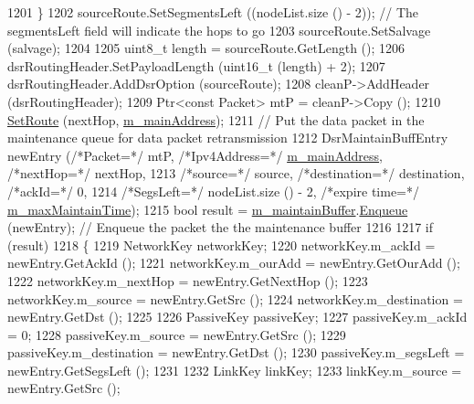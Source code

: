 \begin{DoxyCode}
1201         \}
1202       sourceRoute.SetSegmentsLeft ((nodeList.size () - 2));     \textcolor{comment}{// The segmentsLeft field will indicate the
       hops to go}
1203       sourceRoute.SetSalvage (salvage);
1204 
1205       uint8\_t length = sourceRoute.GetLength ();
1206       dsrRoutingHeader.SetPayloadLength (uint16\_t (length) + 2);
1207       dsrRoutingHeader.AddDsrOption (sourceRoute);
1208       cleanP->AddHeader (dsrRoutingHeader);
1209       Ptr<const Packet> mtP = cleanP->Copy ();
1210       \hyperlink{classns3_1_1dsr_1_1DsrRouting_a8a726fb52558a1a8172a5bd5b8cdb072}{SetRoute} (nextHop, \hyperlink{classns3_1_1dsr_1_1DsrRouting_a73182b5edee2d8460f28855e058fc9a0}{m\_mainAddress});
1211       \textcolor{comment}{// Put the data packet in the maintenance queue for data packet retransmission}
1212       DsrMaintainBuffEntry newEntry (\textcolor{comment}{/*Packet=*/} mtP, \textcolor{comment}{/*Ipv4Address=*/} 
      \hyperlink{classns3_1_1dsr_1_1DsrRouting_a73182b5edee2d8460f28855e058fc9a0}{m\_mainAddress}, \textcolor{comment}{/*nextHop=*/} nextHop,
1213                                               \textcolor{comment}{/*source=*/} source, \textcolor{comment}{/*destination=*/} destination, \textcolor{comment}{/*ackId=*/} 
      0,
1214                                               \textcolor{comment}{/*SegsLeft=*/} nodeList.size () - 2, \textcolor{comment}{/*expire time=*/} 
      \hyperlink{classns3_1_1dsr_1_1DsrRouting_ac6b1dffa9665af0d6a71aa7b947962ee}{m\_maxMaintainTime});
1215       \textcolor{keywordtype}{bool} result = \hyperlink{classns3_1_1dsr_1_1DsrRouting_ac9d28a64437fbe20a4228c9811f9fc27}{m\_maintainBuffer}.\hyperlink{classns3_1_1dsr_1_1DsrMaintainBuffer_a8ec30b5b9b0f6af36e61867327a47717}{Enqueue} (newEntry);     \textcolor{comment}{// Enqueue the packet
       the the maintenance buffer}
1216 
1217       \textcolor{keywordflow}{if} (result)
1218         \{
1219           NetworkKey networkKey;
1220           networkKey.m\_ackId = newEntry.GetAckId ();
1221           networkKey.m\_ourAdd = newEntry.GetOurAdd ();
1222           networkKey.m\_nextHop = newEntry.GetNextHop ();
1223           networkKey.m\_source = newEntry.GetSrc ();
1224           networkKey.m\_destination = newEntry.GetDst ();
1225 
1226           PassiveKey passiveKey;
1227           passiveKey.m\_ackId = 0;
1228           passiveKey.m\_source = newEntry.GetSrc ();
1229           passiveKey.m\_destination = newEntry.GetDst ();
1230           passiveKey.m\_segsLeft = newEntry.GetSegsLeft ();
1231 
1232           LinkKey linkKey;
1233           linkKey.m\_source = newEntry.GetSrc ();

\end{DoxyCode}
